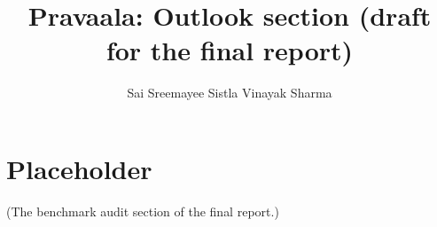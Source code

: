 \documentclass[11pt]{article}
\title{Pravaala: Outlook section (draft for the final report)}
\author{Sai Sreemayee Sistla \And Vinayak Sharma}
\begin{document}
\maketitle
\section{Placeholder}\label{sec:audit}
(The benchmark audit section of the final report.)


\end{document}
